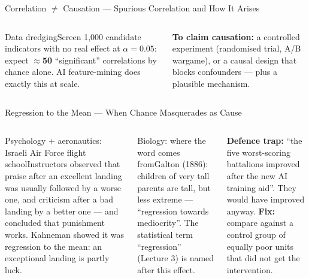 \documentclass[aspectratio=169,10pt,t]{beamer}
\begin{document}
\begin{frame}{Correlation $\neq$ Causation --- Spurious Correlation and How It Arises}
\begin{columns}[T]
\begin{cbox}[ISSAnavy]{Data dredging}\scriptsize Screen 1,000 candidate indicators with no real effect at $\alpha=0.05$: expect $\approx$\textbf{50} ``significant'' correlations by chance alone. AI feature-mining does exactly this at scale.\end{cbox}
\begin{rbox}\scriptsize\textbf{To claim causation:} a controlled experiment (randomised trial, A/B wargame), or a causal design that blocks confounders --- plus a plausible mechanism.\end{rbox}
\end{columns}
\end{frame}

\begin{frame}{Regression to the Mean --- When Chance Masquerades as Cause}
\begin{columns}[T]
\begin{cbox}[violet]{Psychology + aeronautics: Israeli Air Force flight school}\scriptsize Instructors observed that praise after an excellent landing was usually followed by a worse one, and criticism after a bad landing by a better one --- and concluded that punishment works. Kahneman showed it was regression to the mean: an exceptional landing is partly luck.\end{cbox}
\begin{cbox}[ISSAgrn]{Biology: where the word comes from}\scriptsize Galton (1886): children of very tall parents are tall, but less extreme --- ``regression towards mediocrity''. The statistical term ``regression'' (Lecture 3) is named after this effect.\end{cbox}
\begin{wbox}\scriptsize\textbf{Defence trap:} ``the five worst-scoring battalions improved after the new AI training aid''. They would have improved anyway. \textbf{Fix:} compare against a control group of equally poor units that did not get the intervention.\end{wbox}
\end{columns}
\end{frame}
\end{document}
